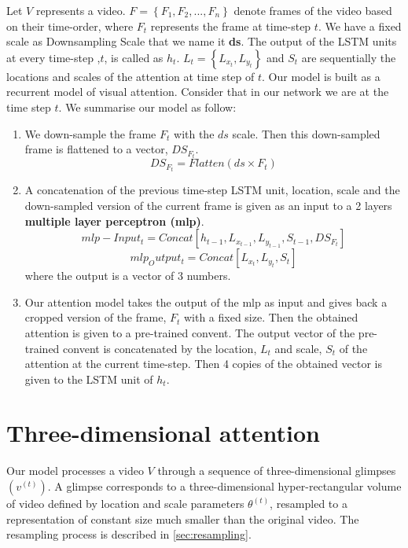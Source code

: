 \documentclass{article} %
\begin{document}
Let $V$ represents a video. $F=\left \{ F_{1}, F_{2}, ..., F_{n} \right \}$ denote frames of the video based on their time-order, where $F_{t}$ represents the frame at time-step $t$. We have a fixed scale as Downsampling Scale that we name it \textbf{ds}. The output of the LSTM units at every time-step ,$t$, is called as $h_{t}$. $L_{t}=\left \{ L_{x_{t}},L_{y_{t}} \right \}$ and $S_{t}$ are sequentially the locations and scales of the attention at time step of $t$.
Our model is built as a recurrent model of visual attention. Consider that in our network we are at the time step $t$. We summarise our model as follow:
\begin{enumerate}
\item We down-sample the frame $F_{t}$ with the $ds$ scale. Then this down-sampled frame is flattened to a vector, $DS_{F_{t}}$.
\begin{equation}
DS_{F_{t}}=Flatten(ds\times F_{t})
\end{equation} 
\item A concatenation of the previous time-step LSTM unit, location, scale and the down-sampled version of the current frame is given as an input to a 2 layers \textbf{multiple layer perceptron (mlp)}.
\begin{equation}
mlp-Input_{t}=Concat\left [h_{t-1}, L_{x_{t-1}},L_{y_{t-1}}, S_{t-1}, DS_{F_{t}}\right]
\end{equation} 
\begin{equation}
mlp_Output_{t}=Concat\left [ L_{x_{t}}, L_{y_{t}}, S_{t}\right]
\end{equation}
where the output is a vector of 3 numbers.
\item Our attention model takes the output of the mlp as input and gives back a cropped version of the frame, $F_{t}$ with a fixed size. Then the obtained attention is given to a pre-trained convent. The output vector of the pre-trained convent is concatenated by the location, $L_{t}$ and scale, $S_{t}$ of the attention at the current time-step. Then 4 copies of the obtained vector is given to the LSTM unit of $h_{t}$.
\end{enumerate}

\section{Three-dimensional attention}

Our model processes a video $V$ through a sequence of three-dimensional glimpses $\left(v^{(t)}\right)$.
A glimpse corresponds to a three-dimensional hyper-rectangular volume of video defined by location and scale parameters $\theta^{(t)}$, resampled to a representation of constant size much smaller than the original video.
The resampling process is described in \ref{sec:resampling}.
\end{document}
